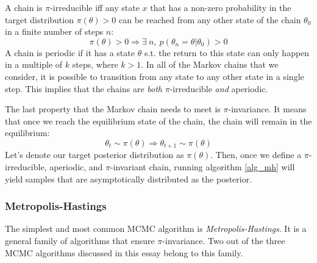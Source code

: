 \documentclass[12pt]{article}
\begin{document}
A chain is $\pi$-irreducible iff any state $x$ that has a non-zero probability in the target distribution $\pi(\theta) > 0$ can be reached from any other state of the chain $\theta_0$ in a finite number of steps $n$:
\begin{equation}
\pi(\theta) > 0 \Rightarrow \exists \ n, \ p(\theta_n = \theta|\theta_0) > 0
\end{equation}
A chain is periodic if it has a state $\theta$ s.t. the return to this state can only happen in a multiple of $k$ steps, where $k > 1$. In all of the Markov chains that we consider, it is possible to transition from any state to any other state in a single step. This implies that the chains are \textit{both} $\pi$-irreducible \textit{and} aperiodic.

The last property that the Markov chain needs to meet is $\pi$-invariance. It means that once we reach the equilibrium state of the chain, the chain will remain in the equilibrium:
\begin{equation}
\theta_t \sim \pi(\theta) \Rightarrow \theta_{t+1} \sim \pi(\theta)
\end{equation}
Let's denote our target posterior distribution as $\pi(\theta)$. Then, once we define a $\pi$-irreducible, aperiodic, and $\pi$-invariant chain, running algorithm \ref{alg_mh} will yield samples that are asymptotically distributed as the posterior.

\subsubsection{Metropolis-Hastings}

The simplest and most common MCMC algorithm is \textit{Metropolis-Hastings}. It is a general family of algorithms that ensure $\pi$-invariance. Two out of the three MCMC algorithms discussed in this essay belong to this family.
\end{document}
